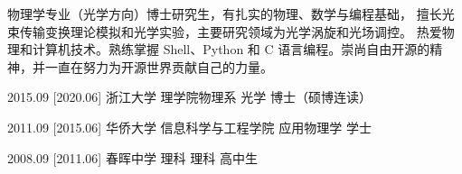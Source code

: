 \documentclass[zh]{resume}
\begin{document}
\makeheader

{\onehalfspacing\hspace{2em}
物理学专业（光学方向）博士研究生，有扎实的物理、数学与编程基础，
擅长光束传输变换理论模拟和光学实验，主要研究领域为光学涡旋和光场调控。
热爱物理和计算机技术。熟练掌握 Shell、Python 和 C 语言编程。崇尚自由开源的精神，并一直在努力为开源世界贡献自己的力量。
\par}


\begin{educations}
  \education%
    {2015.09}%
    [2020.06]%
    {浙江大学}%
    {理学院物理系}%
    {光学}%
    {博士（硕博连读）}

\separator{0.5ex}
\education%
{2011.09}%
[2015.06]%
{华侨大学}%
{信息科学与工程学院}%
{应用物理学}%
{学士}

\separator{0.5ex}
\education%
{2008.09}%
[2011.06]%
{春晖中学}%
{理科}%
{理科}%
{高中生}
\end{educations}
\end{document}
